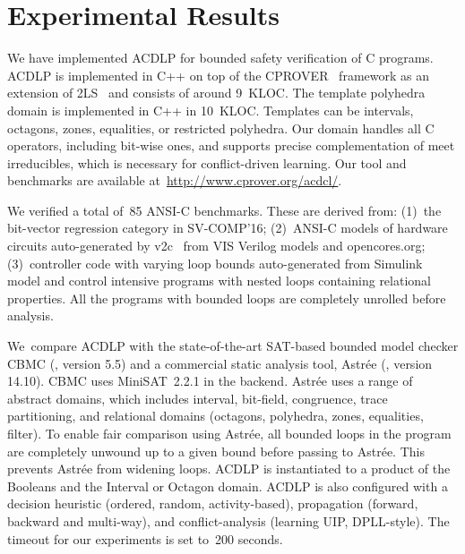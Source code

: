 \section{Experimental Results}
%
We have implemented ACDLP for bounded safety verification of C programs.  
ACDLP is implemented in C++ on top of the
\textsc{CPROVER}~\cite{cprover} framework as an extension of 2LS~\cite{2ls}
and consists of around 9~KLOC. 
The template polyhedra domain is implemented in C++ in 10~KLOC.  Templates
can be intervals, octagons, zones, equalities, or restricted polyhedra.  Our
domain handles all C operators, including bit-wise ones, and supports
precise complementation of meet irreducibles, which is necessary for
conflict-driven learning.  Our tool and benchmarks are available 
at~\url{http://www.cprover.org/acdcl/}.
%


We verified a total of~85 ANSI-C benchmarks.  These are derived from:
(1)~the bit-vector regression category in SV-COMP'16; (2)~ANSI-C models of
hardware circuits auto-generated by v2c~\cite{mtk2016} from VIS Verilog
models and opencores.org; (3)~controller code with varying loop bounds 
auto-generated from Simulink model and control 
intensive programs with nested loops containing relational properties. 
All the programs with bounded loops are completely unrolled before
analysis.  


We~compare ACDLP with the state-of-the-art SAT-based bounded model checker
CBMC (\cite{cbmc}, version 5.5) and a commercial static analysis tool,
Astr{\'e}e (\cite{astree}, version 14.10).  CBMC uses MiniSAT~2.2.1 in the
backend.  Astr{\'e}e uses a range of abstract domains, which includes
interval, bit-field, congruence, trace partitioning, and relational domains
(octagons, polyhedra, zones, equalities, filter).  To enable fair comparison
using Astr{\'e}e, all bounded loops in the program are completely unwound up
to a given bound before passing to Astr{\'e}e.  This prevents Astr{\'e}e
from widening loops.
%
ACDLP is instantiated to a product of the Booleans and the Interval or
Octagon domain.  ACDLP is also configured with a decision heuristic 
(ordered, random, activity-based), propagation (forward, backward and multi-way), 
and conflict-analysis (learning UIP, DPLL-style).  The timeout for our
experiments is set to~200 seconds.
%

